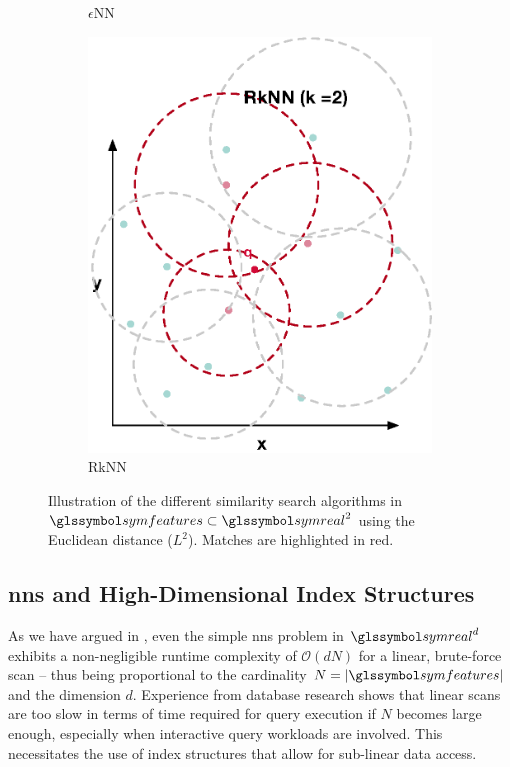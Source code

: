\begin{figure}
\begin{subfigure}[b]{0.25\textwidth}
        \caption{$\epsilon$NN}
        \label{fig:enn}
    \end{subfigure}
    \hfill
    \begin{subfigure}[b]{0.25\textwidth}
        \centering
        \includegraphics[width=\textwidth]{figures/rknn}
        \caption{RkNN}
        \label{fig:rknn}
    \end{subfigure}
    \caption{Illustration of the different similarity search algorithms in $\symfeatures \subset \symreal^2$ using the Euclidean distance ($L^2$). Matches are highlighted in red.}
    \label{fig:sim_search_algorithm}
\end{figure}

\subsection{\texorpdfstring{\acrshort{nns}}{NNS} and High-Dimensional Index Structures}
\label{section:hd_index_structures}

As we have argued in , even the simple \acrshort{nns} problem in $\symreal^d$ exhibits a non-negligible runtime complexity of $\mathcal{O}(dN)$ for a linear, brute-force scan -- thus being proportional to the cardinality $N = |\symfeatures|$ and the dimension $d$. Experience from database research shows that linear scans are too slow in terms of time required for query execution if $N$ becomes large enough, especially when interactive query workloads are involved. This necessitates the use of index structures that allow for sub-linear data access.

